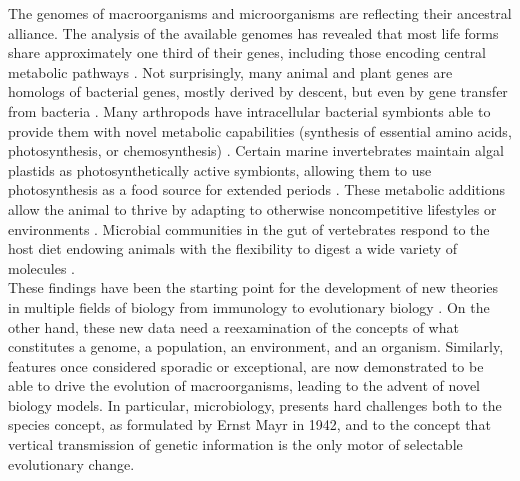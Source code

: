The genomes of macroorganisms and microorganisms are reflecting their ancestral alliance. The analysis of the available genomes has revealed that most life forms share approximately one third of their genes, including those encoding central metabolic pathways \cite{domazet2008ancient}. Not surprisingly, many animal and plant genes are homologs of bacterial genes, mostly derived by descent, but even by gene transfer from bacteria \cite{keeling2008horizontal, hemmingsen1988homologous, pear1996higher}. Many arthropods have intracellular bacterial symbionts able to provide them with novel metabolic capabilities (synthesis of essential amino acids, photosynthesis, or chemosynthesis) \cite{andersson2006genetics}. Certain marine invertebrates maintain algal plastids as photosynthetically active symbionts, allowing them to use photosynthesis as a food source for extended periods \cite{rumpho2011making}. These metabolic additions allow the animal to thrive by adapting to otherwise noncompetitive lifestyles or environments \cite{dubilier2008symbiotic}. Microbial communities in the gut of vertebrates respond to the host diet endowing animals with the flexibility to digest a wide variety of molecules \cite{ley2008worlds, muegge2011diet}.\\
These findings have been the starting point for the development of new theories in multiple fields of biology from immunology \cite{round2009gut} to evolutionary biology \cite{mcfall2013animals}. On the other hand, these new data need a reexamination of the concepts of what constitutes a genome, a population, an environment, and an organism. Similarly, features once considered sporadic or exceptional, are now demonstrated to be able to drive the evolution of macroorganisms, leading to the advent of novel biology models. In particular, microbiology, presents hard challenges both to the species concept, as formulated by Ernst Mayr in 1942, and to the concept that vertical transmission of genetic information is the only motor of selectable evolutionary change.\\

